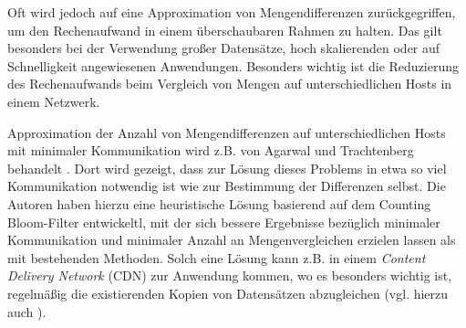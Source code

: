 Oft wird jedoch auf eine Approximation von Mengendifferenzen zurückgegriffen, um den Rechenaufwand in einem überschaubaren Rahmen zu halten. Das gilt besonders bei der Verwendung großer Datensätze, hoch skalierenden oder auf Schnelligkeit angewiesenen Anwendungen. Besonders wichtig ist die Reduzierung des Rechenaufwands beim Vergleich von Mengen auf unterschiedlichen Hosts in einem Netzwerk. 

Approximation der Anzahl von Mengendifferenzen auf unterschiedlichen Hosts mit minimaler Kommunikation wird z.B. von Agarwal und Trachtenberg behandelt \cite{Agarwal2006}. Dort wird gezeigt, dass zur Lösung dieses Problems in etwa so viel Kommunikation notwendig ist wie zur Bestimmung der Differenzen selbst. Die Autoren haben hierzu eine heuristische Lösung basierend auf dem Counting Bloom-Filter entwickeltl, mit der sich bessere Ergebnisse bezüglich minimaler Kommunikation und minimaler Anzahl an Mengenvergleichen erzielen lassen als mit bestehenden Methoden. Solch eine Lösung kann z.B. in einem \textit{Content Delivery Network} (CDN) zur Anwendung kommen, wo es besonders wichtig ist, regelmäßig die existierenden Kopien von Datensätzen abzugleichen (vgl. hierzu auch \cite{Byers2002}). 

